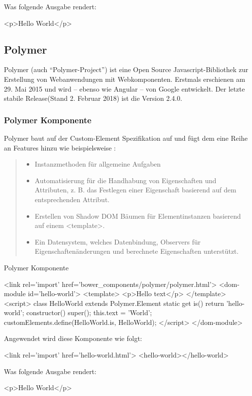 Was folgende Ausgabe rendert:
\begin{JsCode}[numbers=none]
<p>Hello World</p>
\end{JsCode}

\subsection{Polymer }
Polymer (auch "`Polymer-Project"') ist eine Open Source Javascript-Bibliothek zur Erstellung von Webanwendungen mit Webkomponenten. Erstmals erschienen am 29. Mai 2015 und  wird -- ebenso wie Angular -- von Google entwickelt. Der letzte stabile Release(Stand 2. Februar 2018) ist die Version 2.4.0.

\subsubsection{Polymer Komponente}
Polymer baut auf der Custom-Element Spezifikation auf und fügt dem eine Reihe an Features hinzu wie beispielsweise \cite{polymer-elements}:
\begin{quote}
	\begin{itemize}
		\item Instanzmethoden für allgemeine Aufgaben
		\item Automatisierung für die Handhabung von Eigenschaften und Attributen, z. B. das Festlegen einer Eigenschaft basierend auf dem entsprechenden Attribut.
		\item Erstellen von Shadow DOM Bäumen für Elementinstanzen basierend auf einem <template>.
		\item Ein Datensystem, welches Datenbindung, Observers für Eigenschaftenänderungen und berechnete Eigenschaften unterstützt.
	\end{itemize}
\end{quote}
\begin{program}[!htbp]
\caption{Polymer Komponente}
\begin{JsCode}
	<link rel='import' href='bower_components/polymer/polymer.html'>
	<dom-module id='hello-world'>
	<template>
	<p>Hello {{text}}</p>
	</template>
	<script>
	class HelloWorld extends Polymer.Element {
		static get is() {
			return 'hello-world';
		}
		constructor() {
			super();
			this.text = 'World';
		}
	}
	customElements.define(HelloWorld.is, HelloWorld);
	</script>
	</dom-module>
\end{JsCode}
\end{program}
Angewendet wird diese Komponente wie folgt:
\begin{JsCode}[numbers=none]
<link rel='import' href='hello-world.html'>
<hello-world></hello-world>
\end{JsCode}
Was folgende Ausgabe rendert:
\begin{JsCode}[numbers=none]
<p>Hello World</p>
\end{JsCode}

